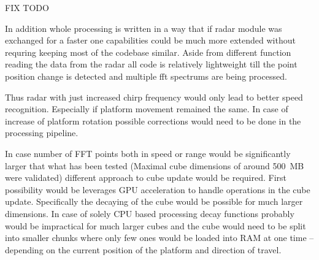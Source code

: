 FIX TODO

In addition whole processing is written in a way that if radar module was exchanged for a faster one capabilities could be much more extended without requring
keeping most of the codebase similar.
Aside from different function reading the data from the radar all code is relatively lightweight till the point position change is detected and multiple fft spectrums are being processed.

Thus radar with just increased chirp frequency would only lead to better speed recognition.
Especially if platform movement remained the same.
In case  of increase of platform rotation possible corrections would need to be done in the processing pipeline.

In case number of FFT points both in speed or range would be significantly larger that what has been tested (Maximal cube dimensions of around 500~MB were validated) different approach to cube update would be required.
First possibility would be leverages GPU acceleration to handle operations in the cube update.
Specifically the decaying of the cube would be possible for much larger dimensions.
In case of solely CPU based processing decay functions probably would be impractical for much larger cubes and the cube would need to be split into smaller chunks where only few ones would be loaded into RAM at one time -- depending on the current position of the platform and direction of travel.



